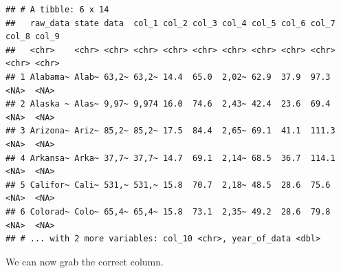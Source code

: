 \documentclass[
]{book}
\newenvironment{Shaded}{\begin{snugshade}}{\end{snugshade}}
\newcommand{\CharTok}[1]{\textcolor[rgb]{0.31,0.60,0.02}{#1}}
\newcommand{\DataTypeTok}[1]{\textcolor[rgb]{0.13,0.29,0.53}{#1}}
\newcommand{\DecValTok}[1]{\textcolor[rgb]{0.00,0.00,0.81}{#1}}
\newcommand{\KeywordTok}[1]{\textcolor[rgb]{0.13,0.29,0.53}{\textbf{#1}}}
\newcommand{\NormalTok}[1]{#1}
\newcommand{\OperatorTok}[1]{\textcolor[rgb]{0.81,0.36,0.00}{\textbf{#1}}}
\newcommand{\OtherTok}[1]{\textcolor[rgb]{0.56,0.35,0.01}{#1}}
\newcommand{\StringTok}[1]{\textcolor[rgb]{0.31,0.60,0.02}{#1}}
\begin{document}
\begin{Shaded}
\end{Shaded}

\begin{verbatim}
## # A tibble: 6 x 14
##   raw_data state data  col_1 col_2 col_3 col_4 col_5 col_6 col_7 col_8 col_9
##   <chr>    <chr> <chr> <chr> <chr> <chr> <chr> <chr> <chr> <chr> <chr> <chr>
## 1 Alabama~ Alab~ 63,2~ 63,2~ 14.4  65.0  2,02~ 62.9  37.9  97.3  <NA>  <NA> 
## 2 Alaska ~ Alas~ 9,97~ 9,974 16.0  74.6  2,43~ 42.4  23.6  69.4  <NA>  <NA> 
## 3 Arizona~ Ariz~ 85,2~ 85,2~ 17.5  84.4  2,65~ 69.1  41.1  111.3 <NA>  <NA> 
## 4 Arkansa~ Arka~ 37,7~ 37,7~ 14.7  69.1  2,14~ 68.5  36.7  114.1 <NA>  <NA> 
## 5 Califor~ Cali~ 531,~ 531,~ 15.8  70.7  2,18~ 48.5  28.6  75.6  <NA>  <NA> 
## 6 Colorad~ Colo~ 65,4~ 65,4~ 15.8  73.1  2,35~ 49.2  28.6  79.8  <NA>  <NA> 
## # ... with 2 more variables: col_10 <chr>, year_of_data <dbl>
\end{verbatim}

We can now grab the correct column.

\begin{Shaded}
\end{Shaded}
\end{document}
